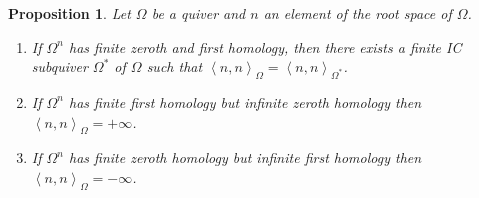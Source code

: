\documentclass{article}
\newcommand{\bracket}[1]{\left \langle #1 \right\rangle}
\newtheorem{proposition}{Proposition}[section]
\begin{document}










\begin{proposition}\label{lpr: convergence of roots based on supports}
Let $\Omega$ be a quiver and $n$ an element of the root space of $\Omega$. 
\begin{enumerate}
    \item If $\Omega^n$ has finite zeroth and first homology, then there exists a finite IC subquiver $\Omega^*$ of $\Omega$ such that $\bracket{n , n}_{\Omega} = \bracket{n,n}_{\Omega^*}$. 
    
    \item If $\Omega^n$ has finite first homology but infinite zeroth homology then $\bracket{n , n}_{\Omega} = +\infty$.

    \item If $\Omega^n$ has finite zeroth homology but infinite first homology then $\bracket{n , n}_{\Omega} = -\infty$.
\end{enumerate}
\end{proposition}
\end{document}
